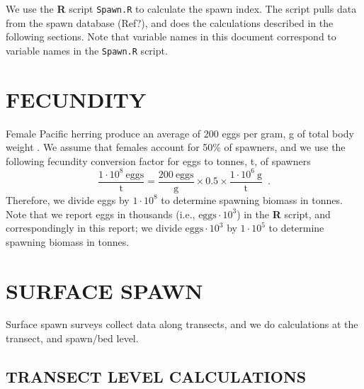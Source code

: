 \documentclass[12pt]{article}
\begin{document}
We use the \textbf{R} \citeyearpar[RCT][]{R-3.3.2} script \texttt{Spawn.R} to calculate the spawn index.
The script pulls data from the spawn database (Ref?), and does the calculations described in the following sections.
Note that variable names in this document correspond to variable names in the \texttt{Spawn.R} script.

\section{FECUNDITY}

Female Pacific herring produce an average of 200 eggs per gram, g of total body weight \citep{Hay1985}.
We assume that females account for 50\% of spawners, and we use the following fecundity conversion factor for eggs to tonnes, t, of spawners
\begin{equation}
\frac {1 \cdot 10^{8}~\text{eggs}} {\text{t}} = \frac{200~\text{eggs}} {\text{g}} \times 0.5 \times \frac{1 \cdot 10^{6}~\text{g}} {\text{t}} \enspace .
\label{eqFecundityConv}
\end{equation}
Therefore, we divide eggs by $1 \cdot 10^{8}$ to determine spawning biomass in tonnes.
Note that we report eggs in thousands (i.e., $\text{eggs} \cdot 10^{3}$) in the \textbf{R} script, and correspondingly in this report; we divide $\text{eggs} \cdot 10^{3}$ by $1 \cdot 10^{5}$ to determine spawning biomass in tonnes.

\section{SURFACE SPAWN}

Surface spawn surveys collect data along transects, and we do calculations at the transect, and spawn/bed level.

\subsection{TRANSECT LEVEL CALCULATIONS}
\end{document}
